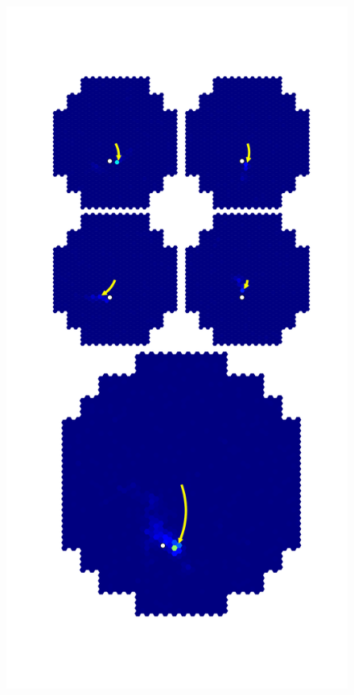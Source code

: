 \documentclass[]{article}
\begin{document}
\begin{figure}
\centering
\begin{minipage}{0.45\textwidth}
\centering
\includegraphics[trim=80 120 80 150,clip,width=\textwidth]{graphDC}

\end{minipage}
\end{figure}
\end{document}
